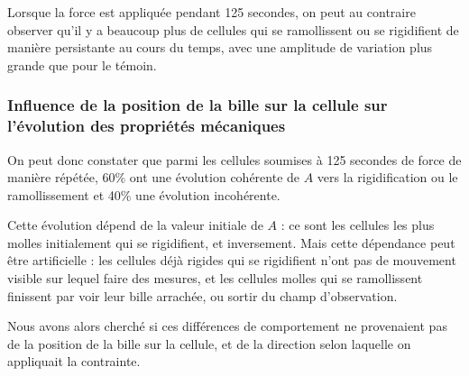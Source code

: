 Lorsque la force est appliquée pendant 125 secondes, on peut au contraire observer qu'il y a beaucoup plus de cellules qui se ramollissent ou se rigidifient de manière persistante au cours du temps, avec une amplitude de variation plus grande que pour le témoin. 

\subsubsection{Influence de la position de la bille sur la cellule sur l'évolution des propriétés mécaniques}

On peut donc constater que parmi les cellules soumises à 125 secondes de force de manière répétée, 60\% ont une évolution cohérente de $A$ vers la rigidification ou le ramollissement et 40\% une évolution incohérente. 

Cette évolution dépend de la valeur initiale de $A$ : ce sont les cellules les plus molles initialement qui se rigidifient, et inversement. Mais cette dépendance peut être artificielle : les cellules déjà rigides qui se rigidifient n'ont pas de mouvement visible sur lequel faire des mesures, et les cellules molles qui se ramollissent finissent par voir leur bille arrachée, ou sortir du champ d'observation. 

Nous avons alors cherché si ces différences de comportement ne provenaient pas de la position de la bille sur la cellule, et de la direction selon laquelle on appliquait la contrainte. 



